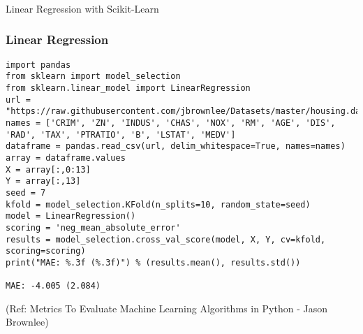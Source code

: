 \begin{frame}[fragile]\frametitle{}
\begin{center}
{\Large Linear Regression with Scikit-Learn}
\end{center}
\end{frame}


\begin{frame}[fragile]\frametitle{Linear Regression}
\begin{lstlisting}
import pandas
from sklearn import model_selection
from sklearn.linear_model import LinearRegression
url = "https://raw.githubusercontent.com/jbrownlee/Datasets/master/housing.data"
names = ['CRIM', 'ZN', 'INDUS', 'CHAS', 'NOX', 'RM', 'AGE', 'DIS', 'RAD', 'TAX', 'PTRATIO', 'B', 'LSTAT', 'MEDV']
dataframe = pandas.read_csv(url, delim_whitespace=True, names=names)
array = dataframe.values
X = array[:,0:13]
Y = array[:,13]
seed = 7
kfold = model_selection.KFold(n_splits=10, random_state=seed)
model = LinearRegression()
scoring = 'neg_mean_absolute_error'
results = model_selection.cross_val_score(model, X, Y, cv=kfold, scoring=scoring)
print("MAE: %.3f (%.3f)") % (results.mean(), results.std())

MAE: -4.005 (2.084)
\end{lstlisting}

{\tiny (Ref: Metrics To Evaluate Machine Learning Algorithms in Python - Jason Brownlee)}

\end{frame}










